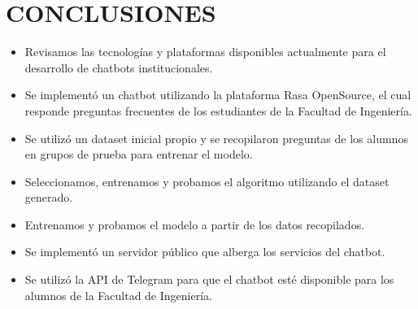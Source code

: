 \chapter[CONCLUSIONES]{CONCLUSIONES}

\begin{itemize}
	\item Revisamos las tecnologías y plataformas disponibles actualmente para el desarrollo de
	      chatbots institucionales.
	\item Se implementó un chatbot utilizando la plataforma Rasa OpenSource, el cual responde preguntas
	      frecuentes de los estudiantes de la Facultad de Ingeniería.
	\item Se utilizó un dataset inicial propio y se recopilaron preguntas de los alumnos en grupos de
	      prueba para entrenar el modelo.
	\item Seleccionamos, entrenamos y probamos el algoritmo utilizando el dataset generado.
	\item Entrenamos y probamos el modelo a partir de los datos recopilados.
	\item Se implementó un servidor público que alberga los servicios del chatbot.
	\item Se utilizó la API de Telegram para que el chatbot esté disponible para los alumnos de la
	      Facultad de Ingeniería.
\end{itemize}
